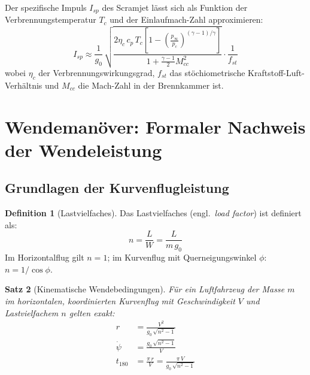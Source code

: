 ﻿\documentclass[12pt,a4paper]{article}
\theoremstyle{plain}
\newtheorem{theorem}{Satz}[section]
\theoremstyle{definition}
\newtheorem{definition}[theorem]{Definition}
\theoremstyle{remark}
\begin{document}
Der spezifische Impuls $I_{sp}$ des Scramjet lässt sich als Funktion der
Verbrennungstemperatur $T_c$ und der Einlaufmach-Zahl approximieren:
\begin{equation}
  I_{sp} \approx \frac{1}{g_0}\,\sqrt{\frac{2\eta_c\,c_p\,T_c\left[1 -
    \left(\frac{p_\infty}{p_c}\right)^{(\gamma-1)/\gamma}\right]}
    {1 + \tfrac{\gamma-1}{2}M_{cc}^2}} \cdot \frac{1}{f_{st}}
  \label{eq:isp_scramjet}
\end{equation}
wobei $\eta_c$ der Verbrennungswirkungsgrad, $f_{st}$ das stöchiometrische
Kraftstoff-Luft-Verhältnis und $M_{cc}$ die Mach-Zahl in der Brennkammer ist.

\section{Wendemanöver: Formaler Nachweis der Wendeleistung}
\label{sec:wende}

\subsection{Grundlagen der Kurvenflugleistung}

\begin{definition}[Lastvielfaches]
  Das Lastvielfaches (engl.\ \emph{load factor}) ist definiert als:
  \begin{equation}
    n = \frac{L}{W} = \frac{L}{m\,g_0}
    \label{eq:n}
  \end{equation}
  Im Horizontalflug gilt $n = 1$; im Kurvenflug mit Querneigungswinkel $\phi$:
  $n = 1/\cos\phi$.
\end{definition}

\begin{theorem}[Kinematische Wendebedingungen]
  \label{thm:wende}
  Für ein Luftfahrzeug der Masse $m$ im horizontalen, koordinierten Kurvenflug
  mit Geschwindigkeit $V$ und Lastvielfachem $n$ gelten exakt:
  \begin{align}
    r &= \frac{V^2}{g_0\,\sqrt{n^2 - 1}}
    \label{eq:radius} \\[4pt]
    \dot{\psi} &= \frac{g_0\,\sqrt{n^2 - 1}}{V}
    \label{eq:psidot} \\[4pt]
    t_{180} &= \frac{\pi\,r}{V} = \frac{\pi\,V}{g_0\,\sqrt{n^2 - 1}}
    \label{eq:t180}
  \end{align}
\end{theorem}
\end{document}
